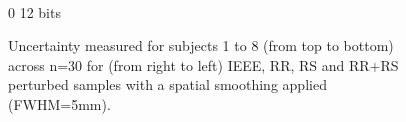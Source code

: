 \documentclass{article}
\begin{document}
\begin{appendices}
\begin{landscape}
\begin{figure}
\begin{subfigure}[t]{0.2\paperheight}
            \end{subfigure} \\
            \hspace*{6cm} 0  12 bits
            \caption{Uncertainty measured for subjects 1 to 8 (from top to bottom) across n=30 for
                (from right to left) IEEE, RR, RS and RR+RS perturbed samples with a spatial smoothing applied (FWHM=5mm). }
            \label{fig:uncertainty_5mm}

        \end{figure}
    \end{landscape}


    \begin{landscape}
        \begin{figure}


\end{figure}
\end{landscape}
\end{appendices}
\end{document}
